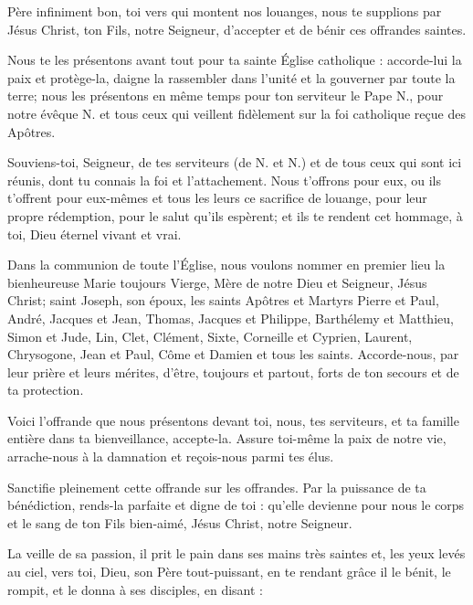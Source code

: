 \begin{paracol}{2}

\LigneParacol
{}
{Père infiniment bon, toi vers qui mon\-tent nos louanges, nous te supplions par Jésus Christ, ton Fils, notre Seigneur, d'accepter et de bénir ces offrandes saintes.}

\LigneParacol
{}
{Nous te les présentons avant tout pour ta sainte Église catholique : accorde-lui la paix et protège-la, daigne la rassembler dans l'unité et la gouverner par toute la terre; nous les présentons en même temps pour ton serviteur le Pape N., pour notre évêque N. et tous ceux qui veillent fidèlement sur la foi catholique reçue des Apôtres.}

\LigneParacol
{}
{Souviens-toi, Seigneur, de tes serviteurs (de N. et N.) et de tous ceux qui sont ici réunis, dont tu connais la foi et l'attachement. Nous t'offrons pour eux, ou ils t'offrent pour eux-mêmes et tous les leurs ce sacrifice de louange, pour leur propre rédemption, pour le salut qu'ils espèrent; et ils te rendent cet hommage, à toi, Dieu éternel vivant et vrai.}

\LigneParacol
{}
{Dans la communion de toute l'Église, nous voulons nommer en premier lieu la bienheureuse Marie toujours Vierge, Mère de notre Dieu et Seigneur, Jésus Christ; saint Joseph, son époux, les saints Apôtres et Martyrs Pierre et Paul, André, Jacques et Jean, Thomas, Jacques et Philippe, Barthélemy et Matthieu, Simon et Jude, Lin, Clet, Clément, Sixte, Corneille et Cyprien, Laurent, Chrysogone, Jean et Paul, Côme et Damien et tous les saints. Accorde-nous, par leur prière et leurs mérites, d'être, toujours et partout, forts de ton secours et de ta protection.}

\LigneParacol
{}
{Voici l'offrande que nous présentons devant toi, nous, tes serviteurs, et ta famille entière dans ta bienveillance, accepte-la. Assure toi-même la paix de notre vie, arrache-nous à la damnation et reçois-nous parmi tes élus.}

\LigneParacol
{}
{Sanctifie pleinement cette offrande sur les offrandes. Par la puissance de ta bénédiction, rends-la parfaite et digne de toi : qu'elle devienne pour nous le corps et le sang de ton Fils bien-aimé, Jésus Christ, notre Seigneur.}

\LigneParacol
{}
{La veille de sa passion, il prit le pain dans ses mains très saintes et, les yeux levés au ciel, vers toi, Dieu, son Père tout-puissant, en te rendant grâce il le bénit, le rompit, et le donna à ses disciples, en disant :}


\end{paracol}
